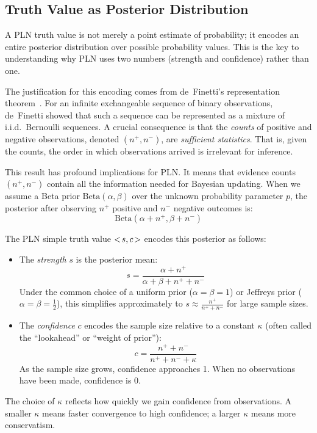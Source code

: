 \documentclass[]{article}
\begin{document}
\subsection{Truth Value as Posterior Distribution}
\label{sec:truthvalue}
A PLN truth value is not merely a point estimate of probability; it
encodes an entire posterior distribution over possible probability
values.  This is the key to understanding why PLN uses two numbers
(strength and confidence) rather than one.

The justification for this encoding comes from de~Finetti's
representation theorem~\cite{definetti1937}.  For an infinite
exchangeable sequence of binary observations, de~Finetti showed that
such a sequence can be represented as a mixture of i.i.d.\ Bernoulli
sequences.  A crucial consequence is that the \emph{counts} of
positive and negative observations, denoted $(n^+, n^-)$, are
\emph{sufficient statistics}.  That is, given the counts, the order in
which observations arrived is irrelevant for inference.

This result has profound implications for PLN.  It means that evidence
counts $(n^+, n^-)$ contain all the information needed for Bayesian
updating.  When we assume a Beta prior $\text{Beta}(\alpha, \beta)$
over the unknown probability parameter $p$, the posterior after
observing $n^+$ positive and $n^-$ negative outcomes is:
$$\text{Beta}(\alpha + n^+, \beta + n^-)$$

The PLN simple truth value $<\!s, c\!>$ encodes this posterior as follows:
\begin{itemize}
\item The \emph{strength} $s$ is the posterior mean:
  $$s = \frac{\alpha + n^+}{\alpha + \beta + n^+ + n^-}$$
  Under the common choice of a uniform prior ($\alpha = \beta = 1$) or
  Jeffreys prior ($\alpha = \beta = \frac{1}{2}$), this simplifies
  approximately to $s \approx \frac{n^+}{n^+ + n^-}$ for large sample
  sizes.

\item The \emph{confidence} $c$ encodes the sample size relative to a
  constant $\kappa$ (often called the ``lookahead'' or ``weight of
  prior''):
  $$c = \frac{n^+ + n^-}{n^+ + n^- + \kappa}$$
  As the sample size grows, confidence approaches 1.  When no
  observations have been made, confidence is 0.
\end{itemize}

The choice of $\kappa$ reflects how quickly we gain confidence from
observations.  A smaller $\kappa$ means faster convergence to high
confidence; a larger $\kappa$ means more conservatism.
\end{document}
